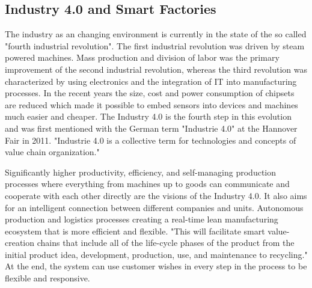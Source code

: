 \subsection{Industry 4.0 and Smart Factories}

The industry as an changing environment is currently in the state of the so called "fourth industrial revolution".
The first industrial revolution was driven by steam powered machines.
Mass production and division of labor was the primary improvement of the second industrial revolution, whereas the third revolution was characterized by using electronics and the integration of \ac{IT} into manufacturing processes.\cite[cf.][p. 1]{Lom2016}
In the recent years the size, cost and power consumption of chipsets are reduced which made it possible to embed sensors into devices and machines much easier and cheaper.\cite[cf.][p. 1]{Brito2016}
The Industry 4.0 is the fourth step in this evolution and was first mentioned with the German term "Industrie 4.0" at the Hannover Fair in 2011.\cite[cf.][p. 1]{Lom2016}
"Industrie 4.0 is a collective term for technologies and concepts of value chain organization."\cite[cf.][p. 11]{Her2015}

Significantly higher productivity, efficiency, and self-managing production processes where everything from machines up to goods can communicate and cooperate with each other directly are the visions of the Industry 4.0.\cite[cf.]{Lyd2016}
It also aims for an intelligent connection between different companies and units.
Autonomous production and logistics processes creating a real-time lean manufacturing ecosystem that is more efficient and flexible.\cite[cf.]{Lyd2016}
"This will facilitate smart value-creation chains that include all of the life-cycle phases of the product from the initial product idea, development, production, use, and maintenance to recycling."\cite{Lyd2016}
At the end, the system can use customer wishes in every step in the process to be flexible and responsive.\cite[cf.]{Lyd2016}

